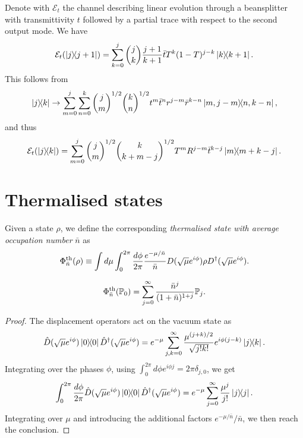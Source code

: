\documentclass[a4paper]{report}
\newcommand{\PP}{\mathbb{P}}
\newcommand{\calE}{{\mathcal{E}}}
\begin{document}
\begin{example}
	Denote with $\calE_t$ the channel describing linear evolution through a beansplitter with transmittivity $t$ followed by a partial trace with respect to the second output mode. We have
	\begin{equation}
		\calE_t(\ketbra{j}{j+1})
		= \sum_{k=0}^j \binom{j}{k} \frac{j+1}{k+1}
		\bar t T^k (1-T)^{j-k} \ketbra{k}{k+1}.
	\end{equation}
	This follows from
	\begin{equation}
		\ketbra{j}{k} \to
		\sum_{m=0}^j \sum_{n=0}^k
		\binom{j}{m}^{1/2} \binom{k}{n}^{1/2}
		t^{m} \bar t^n r^{j-m} \bar r^{k-n}
		\ketbra{m,j-m}{n,k-n},
	\end{equation}
	and thus
	\begin{equation}
		\calE_t(\ketbra{j}{k})
		= \sum_{m=0}^j \binom{j}{m}^{1/2} \binom{k}{k+m-j}^{1/2}
		T^m R^{j-m} \bar t^{k-j}
		\ketbra{m}{m+k-j}.
	\end{equation}
\end{example}


\section{Thermalised states}

\begin{defn}
	Given a state $\rho$, we define the corresponding \emph{thermalised state with average occupation number} $\bar n$ as
	\begin{equation}
		\Phi_{\bar n}^{\rm th}(\rho)
		\equiv \int d\mu\int_0^{2\pi} \frac{d\phi}{2\pi} \frac{e^{-\mu/\bar n}}{\bar n}
		D(\sqrt\mu e^{i\phi})\rho D^\dagger(\sqrt\mu e^{i\phi}).
	\end{equation}
\end{defn}

\begin{prop}
	\begin{equation}
		\Phi^{\rm th}_{\bar n}(\PP_0)
		= \sum_{j=0}^\infty \frac{\bar n^j}{(1+\bar n)^{1+j}} \PP_j.
	\end{equation}
\end{prop}
\begin{proof}
	The displacement operators act on the vacuum state as
	\begin{equation}
		\hat D(\sqrt\mu e^{i\phi})\ketbra0 \hat D^\dagger(\sqrt\mu e^{i\phi})
		= e^{-\mu} \sum_{j,k=0}^\infty \frac{\mu^{(j+k)/2}}{\sqrt{j!k!}} e^{i\phi(j-k)} \ketbra{j}{k}.
	\end{equation}
	Integrating over the phases $\phi$, using $\int_0^{2\pi}d\phi e^{i\phi j}=2\pi \delta_{j,0}$, we get
	\begin{equation}
		\int_0^{2\pi} \frac{d\phi}{2\pi}
		\hat D(\sqrt\mu e^{i\phi})\ketbra0 \hat D^\dagger(\sqrt\mu e^{i\phi})
		= e^{-\mu} \sum_{j=0}^\infty \frac{\mu^j}{j!} \ketbra j.
	\end{equation}
	Integrating over $\mu$ and introducing the additional factors $e^{-\mu/\bar n}/\bar n$, we then reach the conclusion.
\end{proof}
\end{document}
